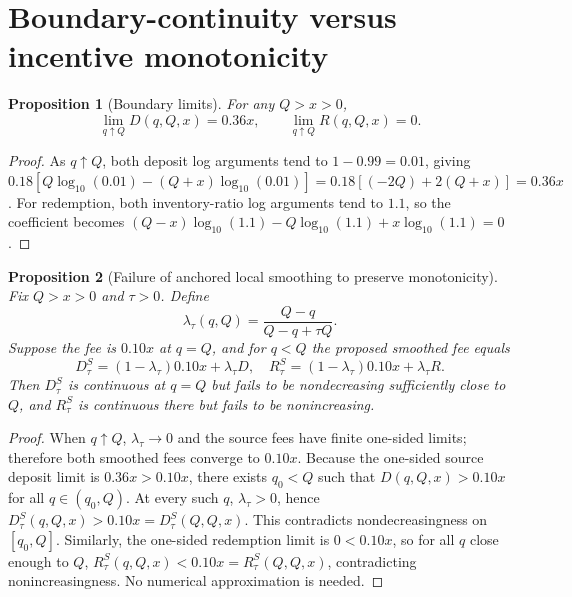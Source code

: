 \documentclass[11pt]{article}
\newtheorem{proposition}{Proposition}
\begin{document}
\section{Boundary-continuity versus incentive monotonicity}
\begin{proposition}[Boundary limits]
For any $Q>x>0$,
\begin{equation}
\lim_{q\uparrow Q}D(q,Q,x)=0.36x,
\qquad \lim_{q\uparrow Q}R(q,Q,x)=0.
\end{equation}
\end{proposition}
\begin{proof}
As $q\uparrow Q$, both deposit log arguments tend to $1-0.99=0.01$, giving
$0.18[Q\log_{10}(0.01)-(Q+x)\log_{10}(0.01)]=0.18[(-2Q)+2(Q+x)]=0.36x$.
For redemption, both inventory-ratio log arguments tend to $1.1$, so the coefficient becomes
$(Q-x)\log_{10}(1.1)-Q\log_{10}(1.1)+x\log_{10}(1.1)=0$.
\end{proof}

\begin{proposition}[Failure of anchored local smoothing to preserve monotonicity]
Fix $Q>x>0$ and $\tau>0$. Define
\begin{equation}
\lambda_{\tau}(q,Q)=\frac{Q-q}{Q-q+\tau Q}.
\end{equation}
Suppose the fee is $0.10x$ at $q=Q$, and for $q<Q$ the proposed smoothed fee equals
\begin{equation}
D_{\tau}^{S}=(1-\lambda_{\tau})0.10x+\lambda_{\tau}D,
\quad R_{\tau}^{S}=(1-\lambda_{\tau})0.10x+\lambda_{\tau}R.
\end{equation}
Then $D_{\tau}^{S}$ is continuous at $q=Q$ but fails to be nondecreasing sufficiently close to $Q$, and $R_{\tau}^{S}$ is continuous there but fails to be nonincreasing.
\end{proposition}
\begin{proof}
When $q\uparrow Q$, $\lambda_{\tau}\to0$ and the source fees have finite one-sided limits; therefore both smoothed fees converge to $0.10x$. Because the one-sided source deposit limit is $0.36x>0.10x$, there exists $q_0<Q$ such that $D(q,Q,x)>0.10x$ for all $q\in(q_0,Q)$. At every such $q$, $\lambda_{\tau}>0$, hence $D_{\tau}^{S}(q,Q,x)>0.10x=D_{\tau}^{S}(Q,Q,x)$. This contradicts nondecreasingness on $[q_0,Q]$. Similarly, the one-sided redemption limit is $0<0.10x$, so for all $q$ close enough to $Q$, $R_{\tau}^{S}(q,Q,x)<0.10x=R_{\tau}^{S}(Q,Q,x)$, contradicting nonincreasingness. No numerical approximation is needed.
\end{proof}
\end{document}
